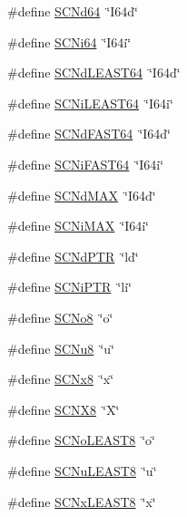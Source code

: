 \begin{DoxyCompactItemize}
\item 
\#define \hyperlink{a00113_ae7044b3fb4cc5cde22155d59437c348f}{S\+C\+Nd64}~\char`\"{}I64d\char`\"{}
\item 
\#define \hyperlink{a00113_adafb1dac927decf0b5f00125a84036fb}{S\+C\+Ni64}~\char`\"{}I64i\char`\"{}
\item 
\#define \hyperlink{a00113_a2009d29e47fedd5cb286d81c83596737}{S\+C\+Nd\+L\+E\+A\+S\+T64}~\char`\"{}I64d\char`\"{}
\item 
\#define \hyperlink{a00113_a9ff978b502f6296f8a5364143eee7f7a}{S\+C\+Ni\+L\+E\+A\+S\+T64}~\char`\"{}I64i\char`\"{}
\item 
\#define \hyperlink{a00113_a2a2d9ca0555230eab89e52e442bea64c}{S\+C\+Nd\+F\+A\+S\+T64}~\char`\"{}I64d\char`\"{}
\item 
\#define \hyperlink{a00113_afa93802b919daecccd6f989cd1750eba}{S\+C\+Ni\+F\+A\+S\+T64}~\char`\"{}I64i\char`\"{}
\item 
\#define \hyperlink{a00113_a3ef7335ee669df2a387707816a45f3ed}{S\+C\+Nd\+M\+AX}~\char`\"{}I64d\char`\"{}
\item 
\#define \hyperlink{a00113_a2f7190d383e2382085b27ffc8ac5a089}{S\+C\+Ni\+M\+AX}~\char`\"{}I64i\char`\"{}
\item 
\#define \hyperlink{a00113_abf657ee6bd4b009b5b072840a3d7364f}{S\+C\+Nd\+P\+TR}~\char`\"{}ld\char`\"{}
\item 
\#define \hyperlink{a00113_a9c632ab51b24b93cc315b27a883be9eb}{S\+C\+Ni\+P\+TR}~\char`\"{}li\char`\"{}
\item 
\#define \hyperlink{a00113_a4e274a339187359a91963d22f8e6faa6}{S\+C\+No8}~\char`\"{}o\char`\"{}
\item 
\#define \hyperlink{a00113_ae0d5458bfaf4c45083b1e92013d77f51}{S\+C\+Nu8}~\char`\"{}u\char`\"{}
\item 
\#define \hyperlink{a00113_a79b1f201c12273510e1fdebfb3a66e9d}{S\+C\+Nx8}~\char`\"{}x\char`\"{}
\item 
\#define \hyperlink{a00113_a99e762a418d90e1df1c6897a2ec5065e}{S\+C\+N\+X8}~\char`\"{}X\char`\"{}
\item 
\#define \hyperlink{a00113_a873157069430be3ab2cade457e92f187}{S\+C\+No\+L\+E\+A\+S\+T8}~\char`\"{}o\char`\"{}
\item 
\#define \hyperlink{a00113_ae409b3af282bc394819a5dd289cdf57c}{S\+C\+Nu\+L\+E\+A\+S\+T8}~\char`\"{}u\char`\"{}
\item 
\#define \hyperlink{a00113_a5cac5341d60e594c818c0f9d25377928}{S\+C\+Nx\+L\+E\+A\+S\+T8}~\char`\"{}x\char`\"{}
\item 

\end{DoxyCompactItemize}
